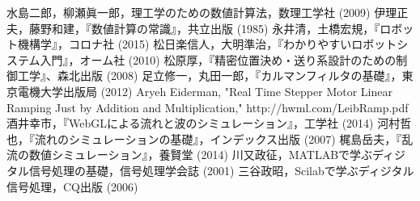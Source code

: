 \documentclass[twocolumn,oneside,a4paper]{article}
\begin{document}




\begin{thebibliography}{99}
    水島二郎，柳瀬眞一郎，理工学のための数値計算法，数理工学社 (2009)
   伊理正夫，藤野和建，『数値計算の常識』，共立出版 (1985)
    永井清，土橋宏規，『ロボット機構学』，コロナ社 (2015)
     松日楽信人，大明準治，『わかりやすいロボットシステム入門』，オーム社 (2010)
     松原厚，『精密位置決め・送り系設計のための制御工学』、森北出版 (2008)
   足立修一，丸田一郎，『カルマンフィルタの基礎』，東京電機大学出版局 (2012)
   Aryeh Eiderman, "Real Time Stepper Motor Linear Ramping Just by Addition and Multiplication," http://hwml.com/LeibRamp.pdf
   酒井幸市，『WebGLによる流れと波のシミュレーション』，工学社 (2014)
   河村哲也，『流れのシミュレーションの基礎』，インデックス出版 (2007)
    梶島岳夫，『乱流の数値シミュレーション』，養賢堂 (2014)
    川又政征，MATLABで学ぶディジタル信号処理の基礎，信号処理学会誌 (2001)
    三谷政昭，Scilabで学ぶディジタル信号処理，CQ出版 (2006)
\end{thebibliography}
\end{document}
